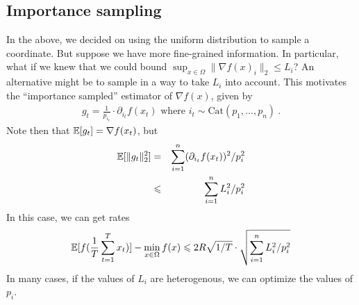 	\subsection{Importance sampling}
	In the above, we decided on using the uniform distribution to sample a
  coordinate. But suppose we have more fine-grained information. In particular, what if we knew that we could bound $\sup_{x \in \Omega} \|\nabla f(x)_i\|_2 \le L_i$? An alternative might be to sample in a way to take $L_i$ into account. This motivates the ``importance sampled'' estimator of $\nabla f(x)$, given by
	\begin{eqnarray}
	g_t = \frac{1}{p_{i_t}} \cdot \partial_{i_t}f(x_{t}) \text{ where } i_t \sim
    \mathrm{Cat}(p_1,\dots,p_n) \ .
	\end{eqnarray}
	Note then that $\operatorname*{\mathbb{E}}[g_t] = \nabla f(x_t)$, but
	\begin{eqnarray}
    \operatorname*{\mathbb{E}}[\|g_t\|^2_2]
    &=& \sum_{i=1}^n (\partial_{i_t}f(x_{t}))^2/p_i^2\\
    &\leqslant& \sum_{i=1}^n L_i^2/p_i^2
	\end{eqnarray}
	In this case, we can get rates 
	\begin{eqnarray}
	  \operatorname*{\mathbb{E}}[f(\frac{1}{T}\sum_{t=1}^T x_t)] - \min_{x \in \Omega}f(x)
    \leqslant 2R\sqrt{1/T}\cdot \sqrt{\sum_{i=1}^n L_i^2/p_i^2}
	\end{eqnarray}
	In many cases, if the values of $L_i$ are heterogenous, we can optimize the values of $p_i$. 
